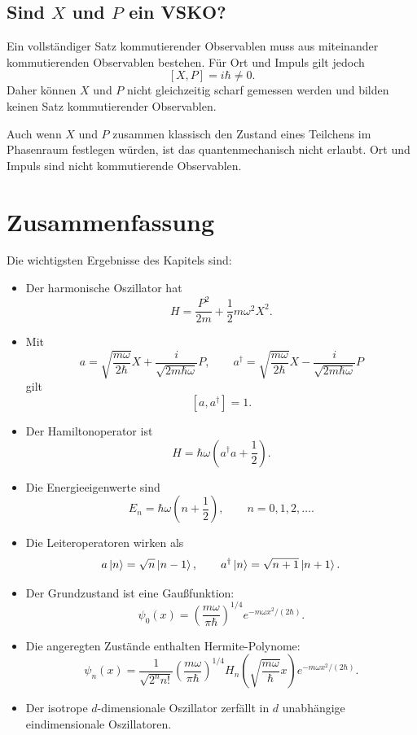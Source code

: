 \subsection{Sind $X$ und $P$ ein VSKO?}

Ein vollständiger Satz kommutierender Observablen muss aus miteinander kommutierenden Observablen bestehen. Für Ort und Impuls gilt jedoch
\[
    [X,P]=i\hbar\neq0.
\]
Daher können $X$ und $P$ nicht gleichzeitig scharf gemessen werden und bilden keinen Satz kommutierender Observablen.

\begin{notebox}
Auch wenn $X$ und $P$ zusammen klassisch den Zustand eines Teilchens im Phasenraum festlegen würden, ist das quantenmechanisch nicht erlaubt. Ort und Impuls sind nicht kommutierende Observablen.
\end{notebox}

\section{Zusammenfassung}

\begin{conceptbox}
Die wichtigsten Ergebnisse des Kapitels sind:
\begin{itemize}
    \item Der harmonische Oszillator hat
    \[
        H=\frac{P^2}{2m}+\frac12m\omega^2X^2.
    \]
    \item Mit
    \[
        a=\sqrt{\frac{m\omega}{2\hbar}}X+\frac{i}{\sqrt{2m\hbar\omega}}P,
        \qquad
        a^\dagger=\sqrt{\frac{m\omega}{2\hbar}}X-\frac{i}{\sqrt{2m\hbar\omega}}P
    \]
    gilt
    \[
        [a,a^\dagger]=1.
    \]
    \item Der Hamiltonoperator ist
    \[
        H=\hbar\omega\left(a^\dagger a+\frac12\right).
    \]
    \item Die Energieeigenwerte sind
    \[
        E_n=\hbar\omega\left(n+\frac12\right),\qquad n=0,1,2,\dots.
    \]
    \item Die Leiteroperatoren wirken als
    \[
        a\left|n\right\rangle=\sqrt n\left|n-1\right\rangle,
        \qquad
        a^\dagger\left|n\right\rangle=\sqrt{n+1}\left|n+1\right\rangle.
    \]
    \item Der Grundzustand ist eine Gaußfunktion:
    \[
        \psi_0(x)=\left(\frac{m\omega}{\pi\hbar}\right)^{1/4}
        e^{-m\omega x^2/(2\hbar)}.
    \]
    \item Die angeregten Zustände enthalten Hermite-Polynome:
    \[
        \psi_n(x)=\frac{1}{\sqrt{2^n n!}}
        \left(\frac{m\omega}{\pi\hbar}\right)^{1/4}
        H_n\left(\sqrt{\frac{m\omega}{\hbar}}x\right)e^{-m\omega x^2/(2\hbar)}.
    \]
    \item Der isotrope $d$-dimensionale Oszillator zerfällt in $d$ unabhängige eindimensionale Oszillatoren.
\end{itemize}
\end{conceptbox}

